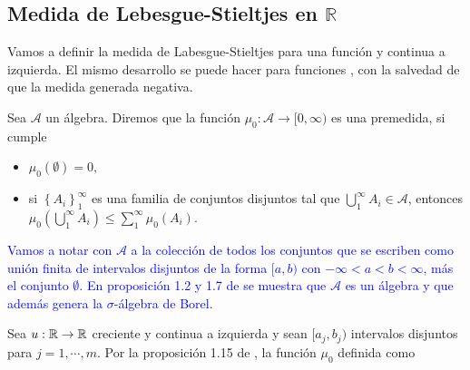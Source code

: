 \subsection{Medida de Lebesgue-Stieltjes en $\mathbb{R}$}
Vamos a definir la medida de Labesgue-Stieltjes para una función  y continua a izquierda. El mismo desarrollo se puede hacer para funciones , con la salvedad de que la medida generada  negativa.


\begin{defi}\label{def:premedida}
Sea $\mathcal{A}$ un álgebra. Diremos que la función $\mu_0:\mathcal{A}\to [0,\infty)$ es una premedida, si cumple 
\begin{itemize}
    \item $\mu_0(\emptyset)=0,$
    \item si $\displaystyle\left\{A_i\right\}_1^\infty$ es una familia de conjuntos disjuntos tal que $\displaystyle\bigcup_1^\infty A_i\in \mathcal{A}$, entonces $\displaystyle\mu_0\left(\bigcup_1^\infty A_i\right)\leq \sum_1^\infty \mu_0\left(A_i\right).$ 
\end{itemize}

\end{defi}
\textcolor{blue}{Vamos a notar con $\mathcal{A}$  a la colección de todos los conjuntos que se escriben como unión finita de intervalos disjuntos de la forma $[a,b)$ con $-\infty<a<b<\infty$, más el conjunto $\emptyset$. En proposición 1.2 y  1.7 de \cite{folland} se muestra que  $\mathcal{A}$ es un álgebra y que además genera la $\sigma$-álgebra de Borel.}



Sea  $u:\mathbb{R} \to \mathbb{R}$  creciente y continua a izquierda y sean  $[a_j,b_j)$ intervalos disjuntos para $j=1, \cdots ,m$. Por la proposición 1.15 de \cite{folland}, la función  $\mu_{0}$ definida como 

